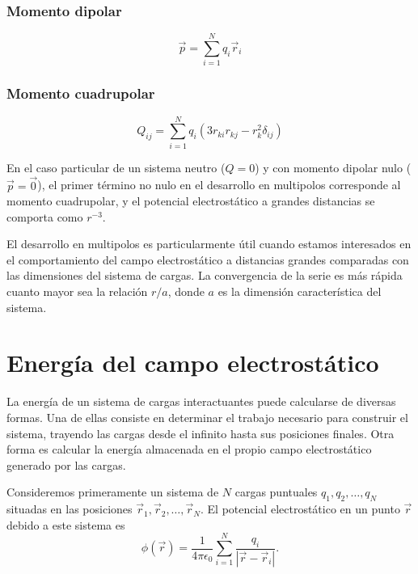 \documentclass[12pt,a4paper]{book}
\begin{document}
\subsubsection{Momento dipolar}
\begin{equation}
\vec{p} = \sum_{i=1}^{N} q_i \vec{r}_i
\end{equation}

\subsubsection{Momento cuadrupolar}
\begin{equation}
Q_{ij} = \sum_{i=1}^{N} q_i (3r_{ki} r_{kj} - r_k^2\delta_{ij})
\end{equation}

En el caso particular de un sistema neutro ($Q = 0$) y con momento dipolar nulo ($\vec{p} = \vec{0}$), el primer término no nulo en el desarrollo en multipolos corresponde al momento cuadrupolar, y el potencial electrostático a grandes distancias se comporta como $r^{-3}$.

El desarrollo en multipolos es particularmente útil cuando estamos interesados en el comportamiento del campo electrostático a distancias grandes comparadas con las dimensiones del sistema de cargas. La convergencia de la serie es más rápida cuanto mayor sea la relación $r/a$, donde $a$ es la dimensión característica del sistema.

\section{Energía del campo electrostático}

La energía de un sistema de cargas interactuantes puede calcularse de diversas formas. Una de ellas consiste en determinar el trabajo necesario para construir el sistema, trayendo las cargas desde el infinito hasta sus posiciones finales. Otra forma es calcular la energía almacenada en el propio campo electrostático generado por las cargas.

Consideremos primeramente un sistema de $N$ cargas puntuales $q_1, q_2, \ldots, q_N$ situadas en las posiciones $\vec{r}_1, \vec{r}_2, \ldots, \vec{r}_N$. El potencial electrostático en un punto $\vec{r}$ debido a este sistema es
\begin{equation}
\phi(\vec{r}) = \frac{1}{4\pi\epsilon_0} \sum_{i=1}^{N} \frac{q_i}{|\vec{r} - \vec{r}_i|}.
\end{equation}
\end{document}
